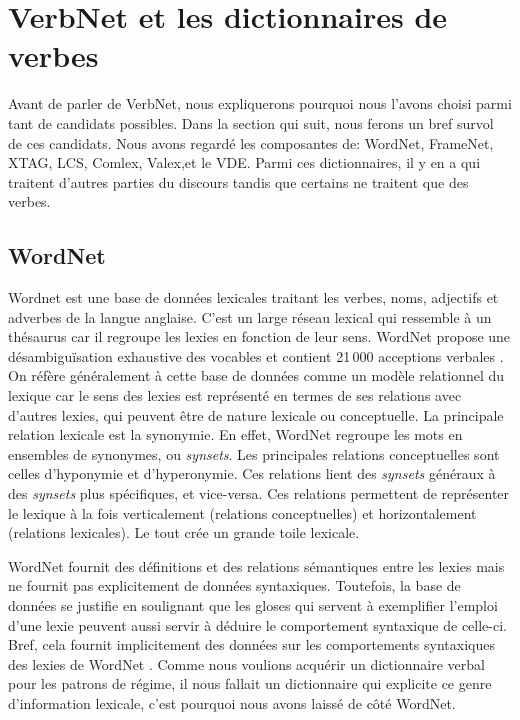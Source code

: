 
\chapter{VerbNet et les dictionnaires de verbes}

Avant de parler de VerbNet, nous expliquerons pourquoi nous l'avons choisi parmi tant de candidats possibles. Dans la section qui suit, nous ferons un bref survol de ces candidats. Nous avons regardé les composantes de: WordNet, FrameNet, XTAG, LCS, Comlex, Valex,et le VDE. Parmi ces dictionnaires, il y en a qui traitent d'autres parties du discours tandis que certains ne traitent que des verbes.


\section{WordNet}
Wordnet \citep{Fellbaum1998} est une base de données lexicales traitant les verbes, noms, adjectifs et adverbes de la langue anglaise. C'est un large réseau lexical qui ressemble à un thésaurus car il regroupe les lexies en fonction de leur sens. WordNet propose une désambiguïsation exhaustive des vocables et contient 21\,000 acceptions verbales \citep{MillerWordNetonlinelexical1990}. On réfère généralement à cette base de données comme un modèle relationnel du lexique car le sens des lexies est représenté en termes de ses relations avec d'autres lexies, qui peuvent être de nature lexicale ou conceptuelle. La principale relation lexicale est la synonymie. En effet, WordNet regroupe les mots en ensembles de synonymes, ou \emph{synsets}. Les principales relations conceptuelles sont celles d'hyponymie et d'hyperonymie. Ces relations lient des \emph{synsets} généraux à des \emph{synsets} plus spécifiques, et vice-versa. Ces relations permettent de représenter le lexique à la fois verticalement (relations conceptuelles) et horizontalement (relations lexicales). Le tout crée un grande toile lexicale.

WordNet fournit des définitions et des relations sémantiques entre les lexies mais ne fournit pas explicitement de données syntaxiques. Toutefois, la base de données se justifie en soulignant que les gloses qui servent à exemplifier l'emploi d'une lexie peuvent aussi servir à déduire le comportement syntaxique de celle-ci. Bref, cela fournit implicitement des données sur les comportements syntaxiques des lexies de WordNet \citep{FellbaumLargescaleLexicographyDigital2014}. Comme nous voulions acquérir un dictionnaire verbal pour les patrons de régime, il nous fallait un dictionnaire qui explicite ce genre d'information lexicale, c'est pourquoi nous avons laissé de côté WordNet.

